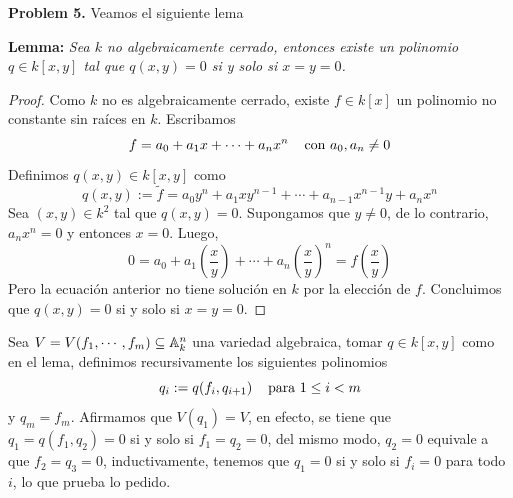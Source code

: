 \documentclass{article}
\begin{document}
\newpage
\noindent\textbf{Problem 5.} Veamos el siguiente lema

\vspace{1mm}
\noindent\textbf{Lemma:} \emph{Sea $k$ no algebraicamente cerrado, entonces existe un polinomio 
$q\in k[x,y]$ tal que $q(x,y)=0$ si y solo si $x=y=0$.}

\begin{proof}
    Como $k$ no es algebraicamente cerrado, existe $f\in k[x]$ un polinomio no constante sin 
    raíces en $k$. Escribamos
    \begin{equation*}
        f=a_{0}+a_{1}x+\cdots+a_{n}x^{n} \hspace{4mm}\text{con }a_{0},a_{n}\neq0
    \end{equation*}
    Definimos $q(x,y)\in k[x,y]$ como
    \begin{equation*}
        q(x,y):=\widetilde{f}=a_{0}y^{n}+a_{1}xy^{n-1}+\cdots+a_{n-1}x^{n-1}y+a_{n}x^{n}
    \end{equation*}
    Sea $(x,y)\in k^{2}$ tal que $q(x,y)=0$. Supongamos que $y\neq0$, de lo contrario, 
    $a_{n}x^{n}=0$ y entonces $x=0$. Luego,
    \begin{equation*}
        0=a_{0}+a_{1}\left(\frac{x}{y}\right)+\cdots+a_{n}\left(\frac{x}{y}\right)^{n}
        =f\left(\frac{x}{y}\right)
    \end{equation*}
    Pero la ecuación anterior no tiene solución en $k$ por la elección de $f$. Concluimos que
    $q(x,y)=0$ si y solo si $x=y=0$.
\end{proof}

\vspace{1mm}
\noindent Sea $V=V(f_{1},\cdots,f_{m})\subseteq\mathbb{A}_{k}^{n}$ una variedad algebraica, tomar 
$q\in k[x,y]$ como en el lema, definimos recursivamente los siguientes polinomios
\begin{equation*}
    q_{i}:=q(f_{i},q_{i+1}) \hspace{4mm}\text{para }1\leq i<m
\end{equation*}
y $q_{m}=f_{m}$. Afirmamos que $V(q_{1})=V$, en efecto, se tiene que $q_{1}=q(f_{1},q_{2})=0$ si y 
solo si $f_{1}=q_{2}=0$, del mismo modo, $q_{2}=0$ equivale a que $f_{2}=q_{3}=0$, inductivamente, 
tenemos que $q_{1}=0$ si y solo si $f_{i}=0$ para todo $i$, lo que prueba lo pedido.
\end{document}
